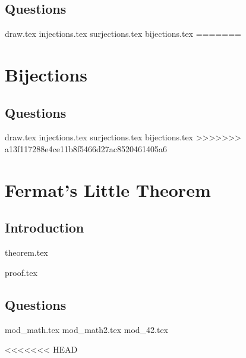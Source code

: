 \documentclass{exam}
\begin{document}
\subsection{Questions}
\begin{questions}
	{draw.tex}
	{injections.tex}
	{surjections.tex}
	{bijections.tex}
=======
\newpage

\section{Bijections}
\subsection{Questions}
\begin{questions}
{draw.tex}
{injections.tex}
{surjections.tex}
{bijections.tex}
>>>>>>> a13f117288e4ce11b8f5466d27ac8520461405a6
\end{questions}

\section{Fermat's Little Theorem}
\subsection{Introduction}
{theorem.tex}
\begin{questions}
{proof.tex}
\end{questions}
\subsection{Questions}
\begin{questions}
{mod_math.tex}
{mod_math2.tex}
{mod_42.tex}
\end{questions}

<<<<<<< HEAD




\end{questions}
\end{document}
